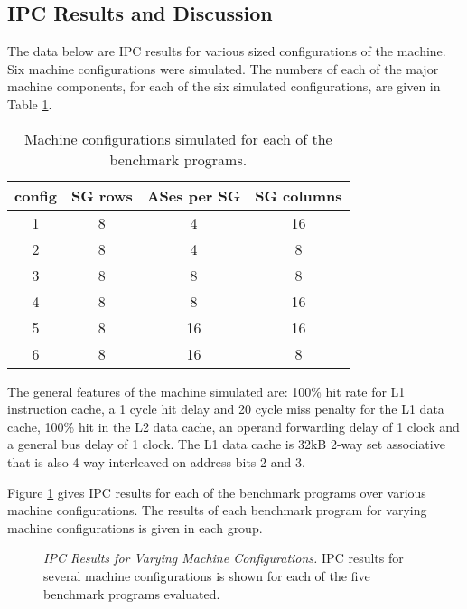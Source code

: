 \documentclass[10pt,dvips]{article}
\begin{document}
\subsection{IPC Results and Discussion}
%
The data below are IPC results for various sized configurations of
the machine.  Six machine configurations were simulated.
The numbers of each of the major machine components, for each of the six
simulated configurations, are given in Table \ref{tab:configs}.

\begin{table}
\begin{center}
\caption{Machine configurations simulated for each of the benchmark
programs.}
\label{tab:configs}
\begin{tabular}{|c|c|c|c|}
\hline 
config&
SG rows&
ASes per SG&
SG columns\\
\hline
\hline 
1&
8&
4&
16\\
\hline 
2&
8&
4&
8\\
\hline 
3&
8&
8&
8\\
\hline 
4&
8&
8&
16\\
\hline 
5&
8&
16&
16\\
\hline 
6&
8&
16&
8\\
\hline
\end{tabular}
\end{center}
\end{table}

The general features of
the machine simulated are: 100\% hit rate for L1 instruction cache,
a 1 cycle hit delay and 20 cycle miss penalty for the L1 data cache,
100\% hit in the L2 data cache, an operand forwarding delay of 1 clock
and a general bus delay of 1 clock.  The L1 data cache is 32kB 2-way
set associative that is also 4-way interleaved on address bits 2 and 3.

Figure \ref{fig:ipc} gives IPC results for each of the benchmark
programs over various machine configurations.
The results of each benchmark program for varying machine
configurations is given in each group.  

\begin{figure}
\centering
{}
\caption{{\em IPC Results for Varying Machine Configurations.} 
IPC results for several machine configurations is shown for each of
the five benchmark programs evaluated.}
\label{fig:ipc}
\end{figure}
\end{document}
